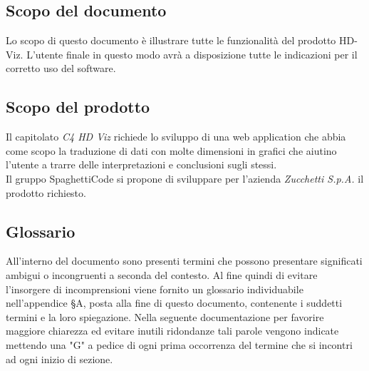 \documentclass[../manuale_utente.tex]{subfiles}
\begin{document}
\subsection{Scopo del documento}
\label{sub:scopo_doc}
Lo scopo di questo documento è illustrare tutte le funzionalità del prodotto HD-Viz. L’utente finale in questo modo avrà a disposizione tutte le indicazioni per il corretto uso del software. 

\subsection{Scopo del prodotto}
\label{sub:scopo_prod}
Il capitolato \emph{ C4 HD Viz} richiede lo sviluppo di una web application che abbia come scopo la traduzione di dati con molte dimensioni in grafici che aiutino l’utente a trarre delle interpretazioni e conclusioni sugli stessi. \\
Il gruppo SpaghettiCode si propone di sviluppare per l’azienda \emph{Zucchetti S.p.A.}  il prodotto richiesto.

\subsection{Glossario}
\label{sub:glossario}
All’interno del documento sono presenti termini che possono presentare significati ambigui o incongruenti a seconda del contesto. 
Al fine quindi di evitare l’insorgere di incomprensioni viene fornito un glossario individuabile nell’appendice §A, posta alla fine di questo documento, contenente i suddetti termini e la loro spiegazione. 
Nella seguente documentazione per favorire maggiore chiarezza ed evitare inutili ridondanze tali parole vengono indicate mettendo una "G" a pedice di ogni prima occorrenza del termine che si incontri ad ogni inizio di sezione. 
\end{document}
